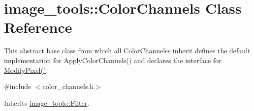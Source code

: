 \hypertarget{classimage__tools_1_1ColorChannels}{}\section{image\+\_\+tools\+:\+:Color\+Channels Class Reference}
\label{classimage__tools_1_1ColorChannels}


This abstract base class from which all Color\+Channelss inherit defines the default implementation for Apply\+Color\+Channels() and declares the interface for \hyperlink{classimage__tools_1_1ColorChannels_ac97f5bae865b5fe1f04306fe0f41d3b9}{Modify\+Pixel()}.  




{\ttfamily \#include $<$color\+\_\+channels.\+h$>$}



Inherits \hyperlink{classimage__tools_1_1Filter}{image\+\_\+tools\+::\+Filter}.

